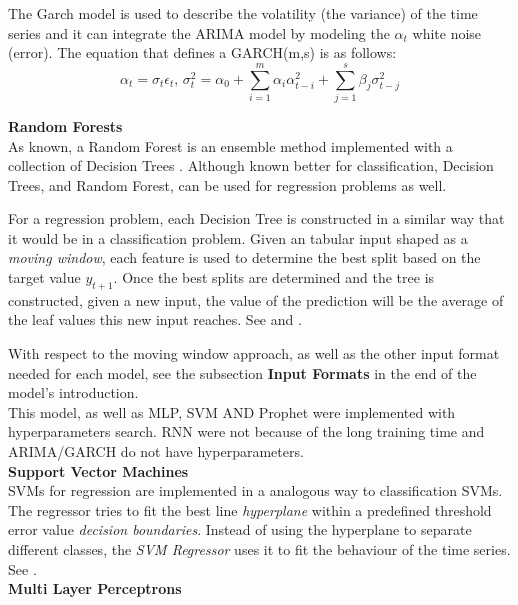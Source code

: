 \documentclass[10pt,twocolumn,letterpaper]{article}
\begin{document}
	
	The Garch model is used to describe the volatility (the variance) of the time series and it can integrate the ARIMA model by modeling the $\alpha_t$ white noise (error). The equation that defines a GARCH(m,s) is as follows:
	\begin{equation}
		\alpha_t=\sigma_t\epsilon_t\mbox{,      }\sigma_t^2=\alpha_0+\sum_{i=1}^{m}\alpha_i\alpha_{t-i}^2+\sum_{j=1}^{s}\beta_j\sigma_{t-j}^2
	\end{equation}
	
	\textbf{Random Forests} \\
	
	As known, a Random Forest is an ensemble method implemented with a collection of Decision Trees \cite{bishop2006pattern}. Although known better for classification, Decision Trees, and Random Forest, can be used for regression problems as well.
	
	For a regression problem, each Decision Tree is constructed in a similar way that it would be in a classification problem. Given an tabular input shaped as a \textit{moving window}, each feature is used to determine the best split based on the target value $y_{t+1}$. Once the best splits are determined and the tree is constructed, given a new input, the value of the prediction will be the average of the leaf values this new input reaches. See \cite{decisiontreeregression} and \cite{randomforestregression}.
	
	With respect to the moving window approach, as well as the other input format needed for each model, see the subsection \textbf{Input Formats} in the end of the model's introduction. \\
	
	This model, as well as MLP, SVM AND Prophet were implemented with hyperparameters search. RNN were not because of the long training time and ARIMA/GARCH do not have hyperparameters.\\
	
	\textbf{Support Vector Machines} \\
	
	SVMs for regression are implemented in a analogous way to classification SVMs. The  regressor tries to fit  the best line \textit{hyperplane} within a predefined threshold error value \textit{decision boundaries}. Instead of using the hyperplane to separate different classes, the \textit{SVM Regressor} uses it to fit the behaviour of the time series. See \cite{svmregression}. \\
	
	
	\textbf{Multi Layer Perceptrons}\\
	
\end{document}

